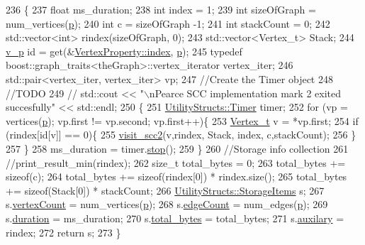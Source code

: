 \begin{DoxyCode}
236                                                 \{
237     \textcolor{keywordtype}{float} ms\_duration;
238     \textcolor{keywordtype}{int} index = 1;
239     \textcolor{keywordtype}{int} sizeOfGraph = num\_vertices(\hyperlink{class_pearce_a2320928312fd97f6bcb1f16684f79a03}{p});
240     \textcolor{keywordtype}{int} c = sizeOfGraph -1;
241     \textcolor{keywordtype}{int} stackCount = 0;
242     std::vector<int> rindex(sizeOfGraph, 0);
243     std::vector<Vertex\_t> Stack;
244     \hyperlink{utilities_8h_a3f4959b3d837fa6351a9414c79280286}{v\_p} \textcolor{keywordtype}{id} = \textcolor{keyword}{get}(&\hyperlink{struct_utility_structs_1_1_vertex_property_a636cb729438e999aa3d9a17ac39d8641}{VertexProperty::index}, \hyperlink{class_pearce_a2320928312fd97f6bcb1f16684f79a03}{p});
245     \textcolor{keyword}{typedef} boost::graph\_traits<theGraph>::vertex\_iterator vertex\_iter;
246     std::pair<vertex\_iter, vertex\_iter> vp;
247     \textcolor{comment}{//Create the Timer object}
248     \textcolor{comment}{//TODO}
249 \textcolor{comment}{//    std::cout << "\(\backslash\)nPearce SCC implementation mark 2 exited succesfully" << std::endl;}
250     \{
251         \hyperlink{class_utility_structs_1_1_timer}{UtilityStructs::Timer} timer;
252         \textcolor{keywordflow}{for} (vp = vertices(\hyperlink{class_pearce_a2320928312fd97f6bcb1f16684f79a03}{p}); vp.first != vp.second; vp.first++)\{
253         \hyperlink{utilities_8h_a344cd987714d06997f0becda3c96d6e2}{Vertex\_t} v = *vp.first;
254         \textcolor{keywordflow}{if} (rindex[\textcolor{keywordtype}{id}[v]] == 0)\{
255             \hyperlink{class_pearce_a12c836f8f0dbd85e20c0f3f4f0c5fb47}{visit\_scc2}(v,rindex, Stack, index, c,stackCount);
256         \}
257         \}
258     ms\_duration = timer.\hyperlink{class_utility_structs_1_1_timer_a12f62b57c263d563efd6089cff52355f}{stop}();
259     \}
260     \textcolor{comment}{//Storage info collection}
261     \textcolor{comment}{//print\_result\_min(rindex);}
262     \textcolor{keywordtype}{size\_t} total\_bytes = 0;
263     total\_bytes += \textcolor{keyword}{sizeof}(c);
264     total\_bytes += \textcolor{keyword}{sizeof}(rindex[0]) * rindex.size();
265     total\_bytes += \textcolor{keyword}{sizeof}(Stack[0]) * stackCount;
266     \hyperlink{struct_utility_structs_1_1_storage_items}{UtilityStructs::StorageItems} s;
267     s.\hyperlink{struct_utility_structs_1_1_storage_items_af72522be713f23fcfe3ac66780183fda}{vertexCount} = num\_vertices(\hyperlink{class_pearce_a2320928312fd97f6bcb1f16684f79a03}{p});
268     s.\hyperlink{struct_utility_structs_1_1_storage_items_afafcba9bb103108e2c1e1d9254fb75c5}{edgeCount} = num\_edges(\hyperlink{class_pearce_a2320928312fd97f6bcb1f16684f79a03}{p});
269     s.\hyperlink{struct_utility_structs_1_1_storage_items_a65e7df5611a4e144cc27576bd3041f6c}{duration} = ms\_duration;
270     s.\hyperlink{struct_utility_structs_1_1_storage_items_a39cf482db54d8e6ac473b438444c8a1e}{total\_bytes} = total\_bytes;
271     s.\hyperlink{struct_utility_structs_1_1_storage_items_afb9d346eaacb1c5e7f60f559c45910f2}{auxilary} = rindex;
272     \textcolor{keywordflow}{return} s;
273 \}
\end{DoxyCode}
